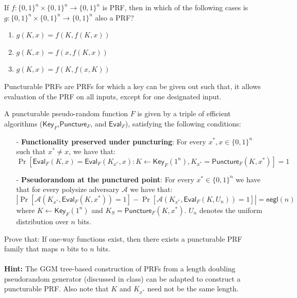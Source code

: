 \begin{exercise}
 If $f: \{0,1\}^{n}\times \{0,1\}^n\rightarrow \{0,1\}^n$  is PRF, then in which of the following cases is $g: \{0,1\}^{n}\times \{0,1\}^n\rightarrow \{0,1\}^n$ also a PRF? \begin{enumerate} \item $g(K,x) = f(K,f(K,x))$ \item $g(K,x) = f(x,f(K,x))$ \item $g(K,x) = f(K,f(x,K))$
    \end{enumerate}
\end{exercise}

\begin{exercise} Puncturable PRFs are PRFs for which a key can be given out such that, it allows evaluation of the PRF on all inputs, except for one designated input.

\newcommand{\negl}{\mathsf{negl}}
\newcommand{\A}{\mathcal{A}}
\newcommand{\F}{F}
\newcommand{\KeyF}{\mathsf{Key}_{\F}}
\newcommand{\PunctureF}{\mathsf{Puncture}_{\F}}
\newcommand{\EvalF}{\mathsf{Eval}_{\F}}


A puncturable pseudo-random function $\F$ is given by a triple of efficient algorithms ($\KeyF$,$\PunctureF$, and $\EvalF$), satisfying the following conditions:
\begin{itemize}
\item[-] \textbf{Functionality preserved under puncturing}: For every $x^*, x \in \{0,1\}^{n}$ such that $x^* \neq x$, we have that:
    $$\Pr[\EvalF(K,x) = \EvalF(K_{x^*},x) : K \gets \KeyF(1^n), K_{x^*} = \PunctureF(K,x^*)] = 1$$
\item[-] \textbf{Pseudorandom at the punctured point}: For every $x^*\in \{0,1\}^n$ we have that for every polysize adversary $\A$ we have that:
    $$|\Pr[\A(K_{x^*}, \EvalF(K,x^*)) = 1] - \Pr[\A(K_{x^*}, \EvalF(K,U_n)) = 1]|= \negl(n)$$
    where $K \gets \KeyF(1^n)$ and $K_S = \PunctureF(K,x^*)$. $U_n$ denotes the uniform distribution over $n$ bits.
\end{itemize}

Prove that: If one-way functions exist, then there exists a puncturable PRF family that maps $n$ bits to $n$ bits. \\ \\
\textbf{Hint:} The GGM tree-based construction of PRFs from a length doubling pseudorandom generator (discussed in class) can be adapted to construct a puncturable PRF. Also note that $K$ and $K_{x^*}$ need not be the same length.
\end{exercise}

